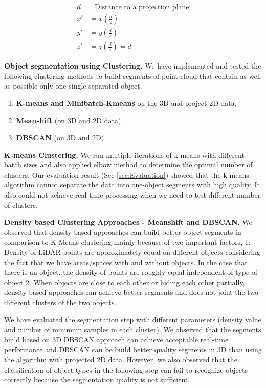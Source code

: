 \begin{align*}
d  & = \text{Distance to a projection plane} \\   
x' & =  x (\frac{d}{z}) \\  
y' & =  y (\frac{d}{z}) \\
z' & =  z (\frac{d}{z}) = d  
\end{align*}



\textbf{Object segmentation using Clustering.} We have implemented and tested the following clustering methods to build segments of point cloud that contain as well as possible only one single separated object.  

\begin{enumerate}
  \item \textbf{K-means and Minibatch-Kmeans} on the 3D and project 2D data.    
  \item \textbf{Meanshift} (on 3D and 2D data) 
  \item \textbf{DBSCAN}  (on 3D and 2D)
\end{enumerate}

\textbf{K-means Clustering.} We run multiple iterations of k-means with different batch sizes and also applied elbow method to determine the optimal number of clusters.
Our evaluation result (Sec \ref{sec:Evaluation}) showed that the k-means algorithm cannot separate the data into one-object segments with high quality. It also could not achieve real-time processing when we need to test different number of clusters. 

\textbf{Density based Clustering Approaches - Meanshift and DBSCAN.} We observed that density based approaches can build better object segments in comparison to K-Means clustering mainly because of two important factors, 1. Density of LiDAR points are approximately equal on different objects considering the fact that we have areas/spaces with and without objects. In the case that there is an object, the density of points are roughly equal independent of type of object 2. When objects are close to each other or hiding each other partially, density-based approaches can achieve better segments and does not joint the two different clusters of the two objects.  

We have evaluated the segmentation step with different parameters (density value and number of minimum samples in each cluster). We observed that the segments build based on 3D DBSCAN approach can achieve acceptable real-time performance and  DBSCAN can be build better quality segments in 3D than using the algorithm with projected 2D data. However, we also observed that the classification of object types in the following step can fail to recognize objects correctly because the segmentation quality is not sufficient. 


